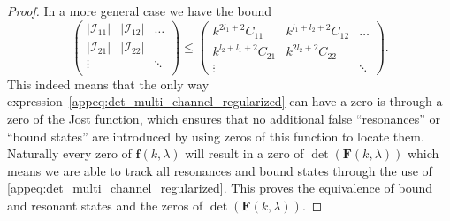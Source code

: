 \documentclass[mathpazo]{cicp}
\begin{document}
\begin{proof}
In a more general case we have the bound
\begin{equation}
	 \begin{pmatrix}
	 	 |\mathcal{I}_{11}| & |\mathcal{I}_{12}| & \ldots \\ 
		|\mathcal{I}_{21}| & |\mathcal{I}_{22}| &\\
		\vdots  &  & \ddots\\
	 \end{pmatrix}
	\le 
	\begin{pmatrix}
    		 k^{2l_1+2} C_{11} &  k^{l_1 + l_2 +2} C_{12} & \ldots \\
  		k^{l_2 + l_1 +2} C_{21} &  k^{2 l_2 +2} C_{22} &  \\
  		\vdots & & \ddots
   	 \end{pmatrix}.
\end{equation}
This indeed means that the only way expression~\eqref{appeq:det_multi_channel_regularized} can have a zero is through a zero of the Jost function, which ensures that no additional false ``resonances'' or ``bound states'' are introduced by using zeros of this function to locate them. Naturally every zero of $\mathbold{f}(k,\lambda)$ will result in a zero of $\det(\mathbold{F}(k,\lambda))$ which means we are able to track all resonances and bound states through the use of \eqref{appeq:det_multi_channel_regularized}. This proves the equivalence of bound and resonant states and the zeros of $\det(\mathbold{F}(k,\lambda))$.
\end{proof}



\end{document}
